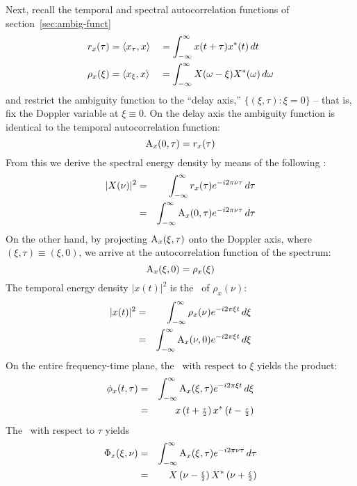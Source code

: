 Next, recall the temporal and spectral autocorrelation functions of
section~\ref{sec:ambig-funct}
\begin{alignat*}{2}
r_{x}(\tau)   &= \langle x_\tau,x\rangle 
              &&= \int_{-\infty}^{\infty} x(t+\tau)x^*(t)\,dt\\
\rho_{x}(\xi) &= \langle x_\xi, x\rangle 
              &&= \int_{-\infty}^{\infty} X(\omega - \xi)X^*(\omega)\,d\omega
\end{alignat*}
and restrict the ambiguity function %
to the ``delay axis,'' $\{(\xi,\tau): \xi=0\}$ -- that is, fix the 
Doppler variable at $\xi \equiv 0$.
On the delay axis the ambiguity function is identical to the temporal
autocorrelation function: 
\[
   \operatorname{A}_x(0,\tau) = r_x(\tau)
\]
From this we derive the spectral energy density by means of the following
\FT :
\begin{eqnarray*}
|X(\nu)|^2&=& \int_{-\infty}^{\infty} r_x(\tau) e^{-i2\pi\nu\tau}\,d\tau\\
         &=& \int_{-\infty}^{\infty} \operatorname{A}_x(0,\tau) e^{-i2\pi\nu\tau}\,d\tau
\end{eqnarray*}
On the other hand, by projecting $\operatorname{A}_x(\xi,\tau)$ onto the Doppler
axis, where $(\xi,\tau) \equiv (\xi,0)$, we arrive at the
autocorrelation function 
of the spectrum:
\[
   \operatorname{A}_x(\xi,0) = \rho_x(\xi)
\]
The temporal energy density %
$|x(t)|^2$ is the \FT\ of
$\rho_x(\nu)$:
\begin{eqnarray*}
|x(t)|^2&=& \int_{-\infty}^{\infty} \rho_x(\nu) e^{-i2\pi\xi t}\,d\xi\\
       &=& \int_{-\infty}^{\infty} \operatorname{A}_x(\nu,0) e^{-i2\pi\xi t}\,d\xi
\end{eqnarray*}
On the entire frequency-time plane, the \FT\ with respect to $\xi$
yields the product: 
\begin{eqnarray}
\phi_x(t,\tau) &=& 
    \int_{-\infty}^{\infty} \operatorname{A}_x(\xi,\tau) e^{-i2\pi\xi t}\,d\xi\nonumber\\
&=& x\left(t+{\scriptstyle \frac{\tau}{2}}\right) x^*\left(t-{\scriptstyle \frac{\tau}{2}}\right) \label{eq:phi}
\end{eqnarray}
The \FT\ with respect to $\tau$ yields%
\begin{eqnarray}
\Phi_x(\xi,\nu) &=& 
    \int_{-\infty}^{\infty} \operatorname{A}_x(\xi,\tau) e^{-i2\pi\nu\tau}\,d\tau \nonumber\\
&=& X\left(\nu-{\scriptstyle \frac{\xi}{2}}\right) X^*\left(\nu+{\scriptstyle \frac{\xi}{2}}\right) \label{eq:Phi}
\end{eqnarray}
